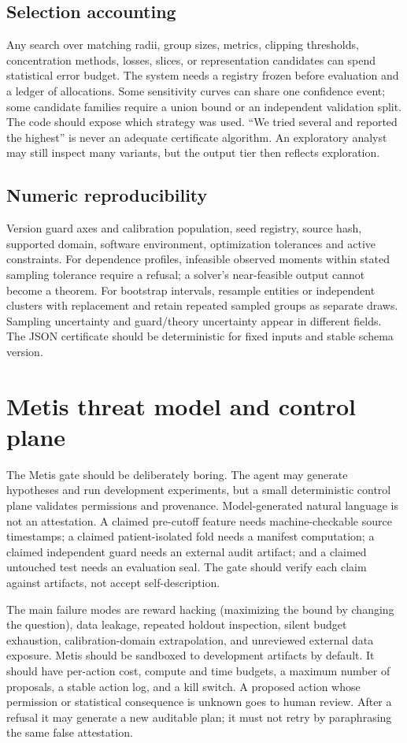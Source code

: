 \documentclass[11pt]{article}
\begin{document}
\subsection{Selection accounting}
Any search over matching radii, group sizes, metrics, clipping thresholds, concentration methods, losses, slices, or representation candidates can spend statistical error budget. The system needs a registry frozen before evaluation and a ledger of allocations. Some sensitivity curves can share one confidence event; some candidate families require a union bound or an independent validation split. The code should expose which strategy was used. ``We tried several and reported the highest'' is never an adequate certificate algorithm. An exploratory analyst may still inspect many variants, but the output tier then reflects exploration.

\subsection{Numeric reproducibility}
Version guard axes and calibration population, seed registry, source hash, supported domain, software environment, optimization tolerances and active constraints. For dependence profiles, infeasible observed moments within stated sampling tolerance require a refusal; a solver's near-feasible output cannot become a theorem. For bootstrap intervals, resample entities or independent clusters with replacement and retain repeated sampled groups as separate draws. Sampling uncertainty and guard/theory uncertainty appear in different fields. The JSON certificate should be deterministic for fixed inputs and stable schema version.

\section{Metis threat model and control plane}
The Metis gate should be deliberately boring. The agent may generate hypotheses and run development experiments, but a small deterministic control plane validates permissions and provenance. Model-generated natural language is not an attestation. A claimed pre-cutoff feature needs machine-checkable source timestamps; a claimed patient-isolated fold needs a manifest computation; a claimed independent guard needs an external audit artifact; and a claimed untouched test needs an evaluation seal. The gate should verify each claim against artifacts, not accept self-description.

The main failure modes are reward hacking (maximizing the bound by changing the question), data leakage, repeated holdout inspection, silent budget exhaustion, calibration-domain extrapolation, and unreviewed external data exposure. Metis should be sandboxed to development artifacts by default. It should have per-action cost, compute and time budgets, a maximum number of proposals, a stable action log, and a kill switch. A proposed action whose permission or statistical consequence is unknown goes to human review. After a refusal it may generate a new auditable plan; it must not retry by paraphrasing the same false attestation.
\end{document}

